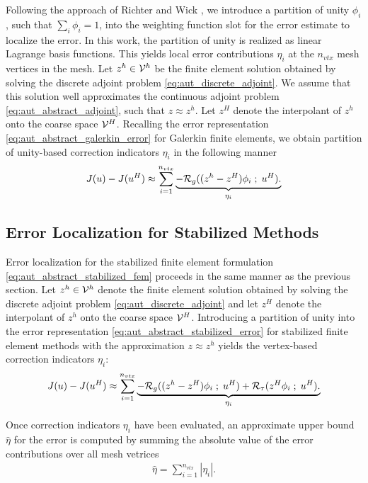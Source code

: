 Following the approach of Richter and Wick
\cite{richter2015variational}, we introduce a partition of unity $\phi_i$, such that
$\sum_i \phi_i = 1$, into the weighting function slot for the
error estimate to localize the error. In this work, the partition of unity is
realized as linear Lagrange basis functions. This yields
local error contributions $\eta_i$ at the $n_{vtx}$ mesh
vertices in the mesh.  Let $z^h \in \mathcal{V}^h$ be the finite element
solution obtained by solving the discrete adjoint problem
\eqref{eq:aut_discrete_adjoint}. We assume that this solution
well approximates the continuous adjoint problem \eqref{eq:aut_abstract_adjoint},
such that $z \approx z^h$. Let $z^H$ denote the interpolant of $z^h$
onto the coarse space $\mathcal{V}^H$. Recalling the error representation
\eqref{eq:aut_abstract_galerkin_error} for Galerkin finite elements,
we obtain partition of unity-based correction indicators $\eta_i$ in the following
manner
%
\begin{gather}
J(u) - J(u^H) \approx
\sum_{i=1}^{n_{vtx}}
\underbrace{
- \mathcal{R}_g( (z^h - z^H) \phi_i \; ; \; u^H).
}_{\eta_i}
\label{eq:aut_galerkin_localization}
\end{gather}

\subsection{Error Localization for Stabilized Methods}

Error localization for the stabilized finite element formulation
\eqref{eq:aut_abstract_stabilized_fem} proceeds in the same manner as the
previous section. Let $z^h \in \mathcal{V}^h$ denote the finite element solution
obtained by solving the discrete adjoint problem
\eqref{eq:aut_discrete_adjoint} and let $z^H$ denote the interpolant
of $z^h$ onto the coarse space $\mathcal{V}^H$. Introducing a partition of unity into the
error representation \eqref{eq:aut_abstract_stabilized_error} for stabilized
finite element methods with the approximation $z \approx z^h$ yields
the vertex-based correction indicators $\eta_i$:
%
\begin{gather}
J(u) - J(u^H) \approx
\sum_{i=1}^{n_{vtx}}
\underbrace{
- \mathcal{R}_g( (z^h - z^H) \phi_i \; ; \; u^H) +
\mathcal{R}_{\tau}( z^H \phi_i \; ; \; u^H).
}_{\eta_i}
\label{eq:aut_stabilized_localization}
\end{gather}

Once correction indicators $\eta_i$ have been evaluated, an approximate
upper bound $\hat{\eta}$ for the error is computed by summing the absolute
value of the error contributions over all mesh vetrices
%
\begin{gather}
\hat{\eta} = \sum_{i=1}^{n_{vtx}} | \eta_i |.
\label{eq:aut_upper_bound}
\end{gather}

